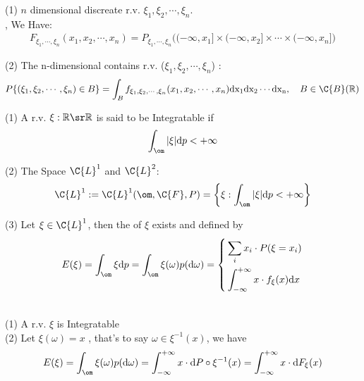 \newcommand{\seqxi}{\ensuremath{\xi_1, \xi_2, \cdots, \xi_n}}
\begin{definition}
(1) $n$ dimensional discreate  r.v. \seqxi.
\\, We Have:
\begin{align*}
    F_{\xi_1, \cdots,\xi_n}(x_1, x_2, \cdots, x_n) = P_{\xi_1, \cdots,\xi_n}\bigg((-\infty, x_1]\times (-\infty, x_2]\times\cdots\times(-\infty, x_n]\bigg)
\end{align*}

(2) The $\mathrm{n}$-dimensional contains r.v. (\seqxi) :
\begin{align*}
    P\{(\seqxi) \in B\} = \int_{B}^{}{f_{\seqxi}(x_1, x_2,\cdots, x_n) \mathrm{dx_1dx_2\cdots dx_n}} 
    ,\quad B \in \C{B}(\rr)
\end{align*}
\end{definition}

\begin{definition}
    (1) A r.v. $\xi: \rr \sr \rr$ is said to be Integratable if 
    \begin{align*}
        \int_{\om}^{}{|\xi| \mathrm{d}p < +\infty}
    \end{align*}

    (2) The Space $\C{L}^1$ and $\C{L}^2$:
    \begin{align*}
    \C{L}^1 := \C{L}^1(\om, \C{F}, P) = \bigg\{\xi: \int_{\om}^{}{|\xi| {\rm d} p} < +\infty\bigg\}
    \end{align*}

    (3) Let $\xi \in \C{L}^1$, then the  of $\xi$ exists and defined by
    \begin{align}
        E(\xi) = \int_{\om}^{}{\xi {\rm d} p} = \int_{\om}^{}{\xi(\omega) p({\rm d}\omega)} 
        = \left\{
        \begin{aligned}
            & \sum_{i}^{}{x_i\cdot P(\xi=x_i)}\\
            & \int_{-\infty}^{+\infty}{x\cdot f_\xi (x){\rm d} x}
        \end{aligned}
        \right.
    \end{align}

    \remark \\
    (1) A r.v. $\xi$ is Integratable \equ {}  \equ {}\\
    (2)  Let $\xi(\omega) = x$ , that's to say $\omega\in \xi^{-1}(x)$, we have
    \begin{align*}
        E(\xi) = \int_{\om}^{}{\xi(\omega) p({\rm d} \omega)}
        = \int_{-\infty}^{+\infty}{x\cdot {\rm d}P\circ \xi^{-1}(x)
        = \int_{-\infty}^{+\infty}{x\cdot {\rm d} F_\xi(x)}}
    \end{align*}
\end{definition}

